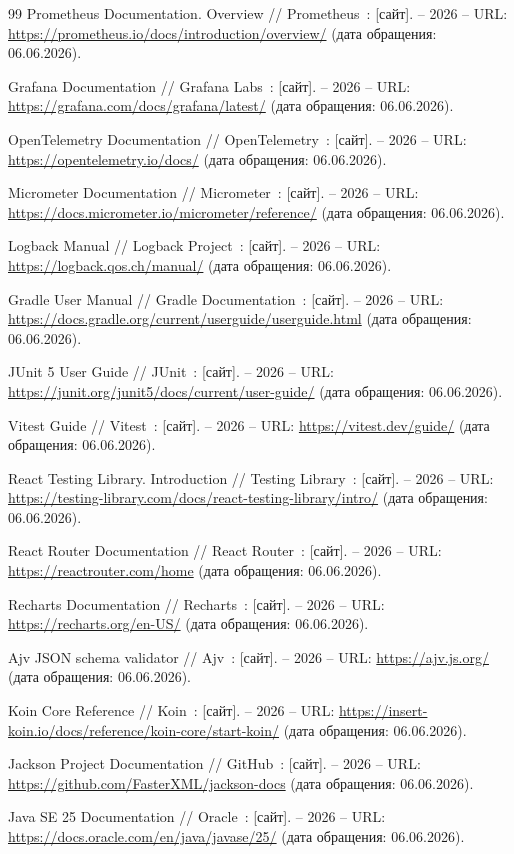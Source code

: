 \begin{thebibliography}{99}
     Prometheus Documentation. Overview // Prometheus~: [сайт]. -- 2026 -- URL: \url{https://prometheus.io/docs/introduction/overview/} (дата обращения: 06.06.2026).

     Grafana Documentation // Grafana Labs~: [сайт]. -- 2026 -- URL: \url{https://grafana.com/docs/grafana/latest/} (дата обращения: 06.06.2026).

     OpenTelemetry Documentation // OpenTelemetry~: [сайт]. -- 2026 -- URL: \url{https://opentelemetry.io/docs/} (дата обращения: 06.06.2026).

     Micrometer Documentation // Micrometer~: [сайт]. -- 2026 -- URL: \url{https://docs.micrometer.io/micrometer/reference/} (дата обращения: 06.06.2026).

     Logback Manual // Logback Project~: [сайт]. -- 2026 -- URL: \url{https://logback.qos.ch/manual/} (дата обращения: 06.06.2026).

     Gradle User Manual // Gradle Documentation~: [сайт]. -- 2026 -- URL: \url{https://docs.gradle.org/current/userguide/userguide.html} (дата обращения: 06.06.2026).

     JUnit 5 User Guide // JUnit~: [сайт]. -- 2026 -- URL: \url{https://junit.org/junit5/docs/current/user-guide/} (дата обращения: 06.06.2026).

     Vitest Guide // Vitest~: [сайт]. -- 2026 -- URL: \url{https://vitest.dev/guide/} (дата обращения: 06.06.2026).

     React Testing Library. Introduction // Testing Library~: [сайт]. -- 2026 -- URL: \url{https://testing-library.com/docs/react-testing-library/intro/} (дата обращения: 06.06.2026).

     React Router Documentation // React Router~: [сайт]. -- 2026 -- URL: \url{https://reactrouter.com/home} (дата обращения: 06.06.2026).

     Recharts Documentation // Recharts~: [сайт]. -- 2026 -- URL: \url{https://recharts.org/en-US/} (дата обращения: 06.06.2026).

     Ajv JSON schema validator // Ajv~: [сайт]. -- 2026 -- URL: \url{https://ajv.js.org/} (дата обращения: 06.06.2026).

     Koin Core Reference // Koin~: [сайт]. -- 2026 -- URL: \url{https://insert-koin.io/docs/reference/koin-core/start-koin/} (дата обращения: 06.06.2026).

     Jackson Project Documentation // GitHub~: [сайт]. -- 2026 -- URL: \url{https://github.com/FasterXML/jackson-docs} (дата обращения: 06.06.2026).

     Java SE 25 Documentation // Oracle~: [сайт]. -- 2026 -- URL: \url{https://docs.oracle.com/en/java/javase/25/} (дата обращения: 06.06.2026).

\end{thebibliography}
